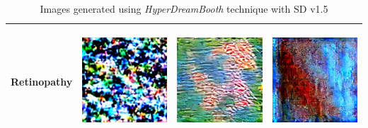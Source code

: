 \begin{table}[H]
\begin{tabularx}{\linewidth}{@{}>{\centering\arraybackslash}m{3cm}>{\centering\arraybackslash}X>{\centering\arraybackslash}X>{\centering\arraybackslash}X@{}}
Retinopathy & \includegraphics[valign=M,width=\linewidth,height=4cm,keepaspectratio]{main/content/images/sd_hyperdreambooth/retinopathy/hp1.jpeg} & \includegraphics[valign=M,width=\linewidth,height=4cm,keepaspectratio]{main/content/images/sd_hyperdreambooth/retinopathy/hp2.jpeg} & \includegraphics[valign=M,width=\linewidth,height=4cm,keepaspectratio]{main/content/images/sd_hyperdreambooth/retinopathy/hp3.jpeg} \\
\bottomrule
\end{tabularx}
\caption{Images generated using \textit{HyperDreamBooth} technique with SD v1.5}
\label{tab:image_comparison_hyperdreambooth}
\end{table}
